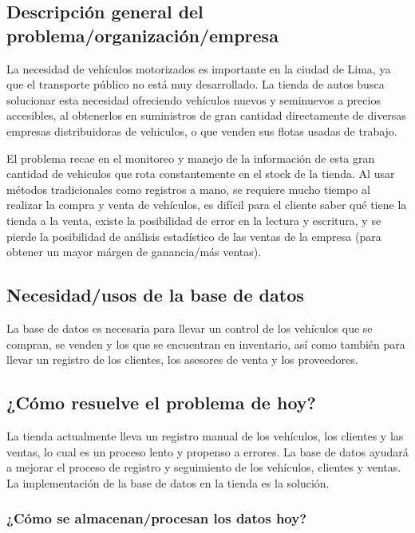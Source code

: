 \documentclass[12pt]{article}
\begin{document}
\subsection{Descripci\'on general del problema/organizaci\'on/empresa}

La necesidad de vehículos motorizados es importante en la ciudad de Lima, ya que el transporte público no está muy desarrollado. La tienda de autos busca solucionar esta necesidad ofreciendo vehículos nuevos y seminuevos a precios accesibles, al obtenerlos en suministros de gran cantidad directamente de diversas empresas distribuidoras de vehiculos, o que venden sus flotas usadas de trabajo.

El problema recae en el monitoreo y manejo de la información de esta gran cantidad de vehiculos que rota constantemente en el stock de la tienda. Al usar métodos tradicionales como registros a mano, se requiere mucho tiempo al realizar la compra y venta de vehículos, es difícil para el cliente saber qué tiene la tienda a la venta, existe la posibilidad de error en la lectura y escritura, y se pierde la posibilidad de análisis estadístico de las ventas de la empresa (para obtener un mayor márgen de ganancia/más ventas).

\subsection{Necesidad/usos de la base de datos}

La base de datos es necesaria para llevar un control de los vehículos que se compran, se venden y los que se encuentran en inventario, así como también para llevar un registro de los clientes, los asesores de venta y los proveedores.

\subsection{¿Cómo resuelve el problema de hoy?}

La tienda actualmente lleva un registro manual de los vehículos, los clientes y las ventas, lo cual es un proceso lento y propenso a errores. La base de datos ayudará a mejorar el proceso de registro y seguimiento de los vehículos, clientes y ventas. La implementación de la base de datos en la tienda es la solución.

\subsubsection{¿Cómo se almacenan/procesan los datos hoy?}
\end{document}
